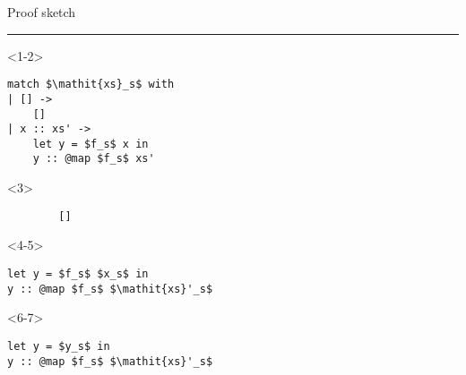 \begin{frame}[fragile]{Proof sketch}
\begin{mathpar}
\end{mathpar}
\vfill
\hrule
\vfill
\begin{minipage}{.4\columnwidth}
    \begin{onlyenv}<1-2>
        \begin{lstlisting}
match $\mathit{xs}_s$ with
| [] ->
    []
| x :: xs' ->
    let y = $f_s$ x in
    y :: @map $f_s$ xs'
        \end{lstlisting}
    \end{onlyenv}
    \begin{onlyenv}<3>
        \begin{lstlisting}
        []
        \end{lstlisting}
    \end{onlyenv}
    \begin{onlyenv}<4-5>
        \begin{lstlisting}
let y = $f_s$ $x_s$ in
y :: @map $f_s$ $\mathit{xs}'_s$
        \end{lstlisting}
    \end{onlyenv}
    \begin{onlyenv}<6-7>
        \begin{lstlisting}
let y = $y_s$ in
y :: @map $f_s$ $\mathit{xs}'_s$
        \end{lstlisting}
    \end{onlyenv}

\end{minipage}
\end{frame}
